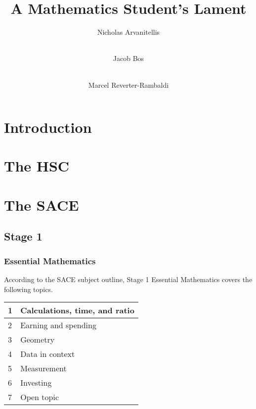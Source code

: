 \documentclass[11pt]{report}
\title{A Mathematics Student's Lament}
\author[1]{Nicholas Arvanitellis}
\author[2]{\\Jacob Bos}
\author[3]{\\Marcel Reverter-Rambaldi}
\affil[1,2,3]{Australian National University}
\affil[3]{The University of Queensland}
\begin{document}
    \maketitle
    \tableofcontents
\newpage
{}

\chapter{Introduction}




\chapter{The HSC}




\chapter{The SACE}

\section{Stage 1}
\subsection{Essential Mathematics}

    According to the SACE subject outline, Stage 1 Essential Mathematics covers the following topics.
    \begin{table}[H]
        \centering
        \begin{tabular}{|l|l|}
        \hline
            1 & Calculations, time, and ratio \\ \hline
            2 & Earning and spending \\ \hline
            3 & Geometry \\ \hline
            4 & Data in context \\ \hline
            5 & Measurement \\ \hline
            6 & Investing \\ \hline
            7 & Open topic \\ \hline
        \end{tabular}
    \end{table}
\end{document}
